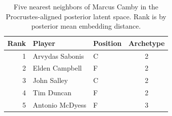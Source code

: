 \begin{table}[htbp]
  \centering\small
  \begin{tabular}{rllc}
    \toprule
    Rank & Player & Position & Archetype \\
    \midrule
    1 & Arvydas Sabonis & C & 2 \\
    2 & Elden Campbell & F & 2 \\
    3 & John Salley & C & 2 \\
    4 & Tim Duncan & F & 2 \\
    5 & Antonio McDyess & F & 3 \\
    \bottomrule
  \end{tabular}
  \caption{Five nearest neighbors of Marcus Camby in the Procrustes-aligned posterior latent space. Rank is by posterior mean embedding distance.}
  \label{tab:Marcus_Camby_neighbors}
\end{table}

